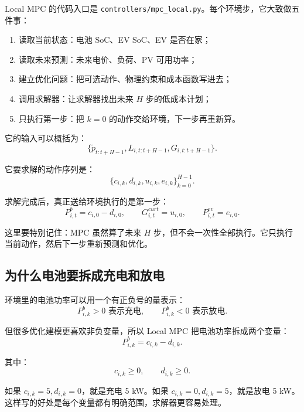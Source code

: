 \documentclass[UTF8,zihao=-4]{ctexart}
\begin{document}
Local MPC 的代码入口是 \texttt{controllers/mpc\_local.py}。每个环境步，它大致做五件事：
\begin{enumerate}
  \item 读取当前状态：电池 SoC、EV SoC、EV 是否在家；
  \item 读取未来预测：未来电价、负荷、PV 可用功率；
  \item 建立优化问题：把可选动作、物理约束和成本函数写进去；
  \item 调用求解器：让求解器找出未来 $H$ 步的低成本计划；
  \item 只执行第一步：把 $k=0$ 的动作交给环境，下一步再重新算。
\end{enumerate}

它的输入可以概括为：
\begin{equation}
\{\tilde p_{t:t+H-1},L_{i,t:t+H-1},G_{i,t:t+H-1}\}.
\end{equation}

它要求解的动作序列是：
\begin{equation}
\{c_{i,k},d_{i,k},u_{i,k},e_{i,k}\}_{k=0}^{H-1}.
\end{equation}

求解完成后，真正送给环境执行的是第一步：
\begin{equation}
P^b_{i,t}=c_{i,0}-d_{i,0},\qquad
G^{curt}_{i,t}=u_{i,0},\qquad
P^{ev}_{i,t}=e_{i,0}.
\end{equation}

这里要特别记住：MPC 虽然算了未来 $H$ 步，但不会一次性全部执行。它只执行当前动作，然后下一步重新预测和优化。

\subsection{为什么电池要拆成充电和放电}

环境里的电池功率可以用一个有正负号的量表示：
\begin{equation}
P^b_{i,k}>0 \text{ 表示充电},\qquad
P^b_{i,k}<0 \text{ 表示放电}.
\end{equation}

但很多优化建模更喜欢非负变量，所以 Local MPC 把电池功率拆成两个变量：
\begin{equation}
P^b_{i,k}=c_{i,k}-d_{i,k}.
\end{equation}

其中：
\begin{equation}
c_{i,k}\ge 0,\qquad d_{i,k}\ge 0.
\end{equation}

如果 $c_{i,k}=5,d_{i,k}=0$，就是充电 5 kW。如果 $c_{i,k}=0,d_{i,k}=5$，就是放电 5 kW。这样写的好处是每个变量都有明确范围，求解器更容易处理。
\end{document}
